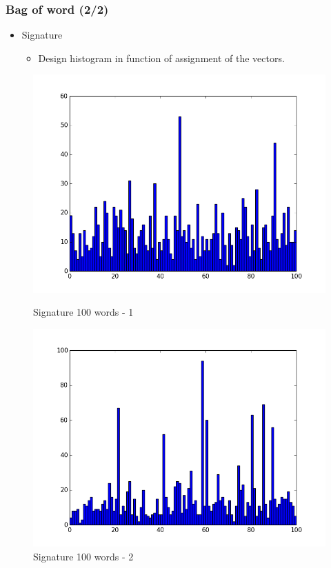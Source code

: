 \documentclass[xcolor=table]{beamer}
\begin{document}
\begin{frame} \frametitle{Bag of word (2/2)}
\begin{itemize}
    \item Signature
    \begin{itemize}
        \item Design histogram in function of assignment of the vectors.
    \end{itemize}
\end{itemize}

\begin{figure}[htbp]
    \begin{minipage}[c]{.45\linewidth}
      \begin{center}
    \includegraphics[scale=0.20]{131_sig.png}
    \caption{Signature 100 words - 1}
    \label{fig:image4}
      \end{center}
    \end{minipage}
    \hfill
    \begin{minipage}[c]{.45\linewidth}
      \begin{center}
    \includegraphics[scale=0.20]{132_sig.png}
    \caption{Signature 100 words - 2}
    \label{fig:image5}
      \end{center}
    \end{minipage}
\end{figure}



\end{frame}
\end{document}
